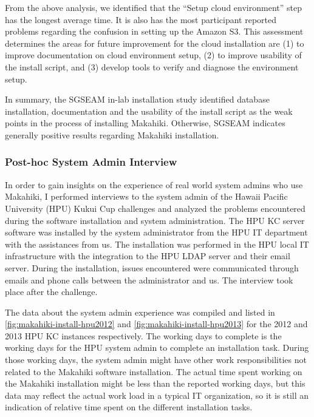 From the above analysis, we identified that the ``Setup cloud environment'' step has the
longest average time. It is also has the most participant reported problems regarding the confusion in setting up the Amazon S3. This assessment determines the areas for future improvement for the cloud installation are (1) to improve documentation on cloud environment setup, (2) to improve usability of the install script, and (3) develop tools to verify and diagnose the environment setup.

In summary, the SGSEAM in-lab installation study identified database installation, documentation and the usability of the install script as the weak points in the process of installing Makahiki.  Otherwise, SGSEAM indicates generally positive results regarding Makahiki installation.

\subsubsection{Post-hoc System Admin Interview}
In order to gain insights on the experience of real world system admins who use Makahiki, I performed interviews to the system admin of the Hawaii Pacific University (HPU) Kukui Cup challenges and analyzed the problems encountered during the software installation and system administration. The HPU KC server software was installed by the system administrator from the HPU IT department with the assistances from us. The installation was performed in the HPU local IT infrastructure with the integration to the HPU LDAP server and their email server.  During the installation, issues encountered were communicated through emails and phone calls between the administrator and us. The interview took place after the challenge. 

The data about the system admin experience was compiled and listed in \autoref{fig:makahiki-install-hpu2012} and \autoref{fig:makahiki-install-hpu2013} for the 2012 and 2013 HPU KC instances respectively. The working days to complete is the working days for the HPU system admin to complete an  installation task. During those working days, the system admin might have other work responsibilities not related to the Makahiki software installation. The actual time spent working on the Makahiki installation might be less than the reported working days, but this data may reflect the actual work load in a typical IT organization, so it is still an indication of relative time spent on the different installation tasks.

